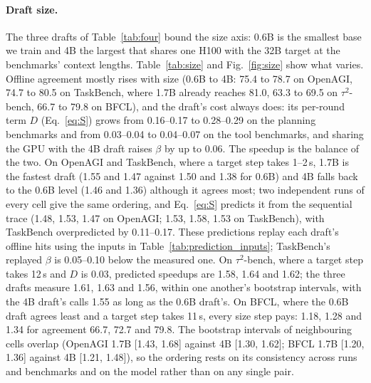 \paragraph{Draft size.}
The three drafts of Table~\ref{tab:four} bound the size axis: 0.6B is the smallest base we train and 4B the
largest that shares one H100 with the 32B target at the benchmarks' context lengths. Table~\ref{tab:size} and
Fig.~\ref{fig:size} show what varies. Offline agreement mostly rises with size
(0.6B to 4B: 75.4 to 78.7 on OpenAGI, 74.7 to 80.5 on TaskBench, where 1.7B already reaches 81.0, 63.3 to 69.5 on
$\tau^2$-bench, 66.7 to 79.8 on BFCL), and the draft's cost always does: its per-round term $D$ (Eq.~\ref{eq:S}) grows from 0.16--0.17 to
0.28--0.29 on the planning benchmarks and from 0.03--0.04 to 0.04--0.07 on the tool benchmarks, and sharing
the GPU with the 4B draft raises $\beta$ by up to 0.06. The speedup is the balance of the two. On OpenAGI and
TaskBench, where a target step takes 1--2\,s, 1.7B is the fastest draft (1.55 and 1.47\xx{} against 1.50 and
1.38\xx{} for 0.6B) and 4B falls back to the 0.6B level (1.46 and 1.36\xx{}) although it agrees most; two
independent runs of every cell give the same ordering, and Eq.~\ref{eq:S} predicts it from the sequential
trace (1.48, 1.53, 1.47 on OpenAGI; 1.53, 1.58, 1.53 on TaskBench), with TaskBench
overpredicted by 0.11--0.17. These predictions replay each draft's offline hits using the inputs in
Table~\ref{tab:prediction_inputs}; TaskBench's replayed $\beta$ is 0.05--0.10 below the measured one.
On $\tau^2$-bench, where a target step takes 12\,s and $D$ is 0.03, predicted speedups are 1.58,
1.64 and 1.62; the three drafts measure 1.61, 1.63 and 1.56\xx{}, within one another's bootstrap intervals,
with the 4B draft's calls 1.55\xx{} as long as the 0.6B draft's. On BFCL, where the 0.6B draft agrees least
and a target step takes 11\,s, every size step pays: 1.18, 1.28 and 1.34\xx{} for agreement 66.7, 72.7 and
79.8. The bootstrap intervals of neighbouring cells overlap (OpenAGI 1.7B [1.43, 1.68] against 4B [1.30,
1.62]; BFCL 1.7B [1.20, 1.36] against 4B [1.21, 1.48]), so the ordering rests on its consistency across
runs and benchmarks and on the model rather than on any single pair.

